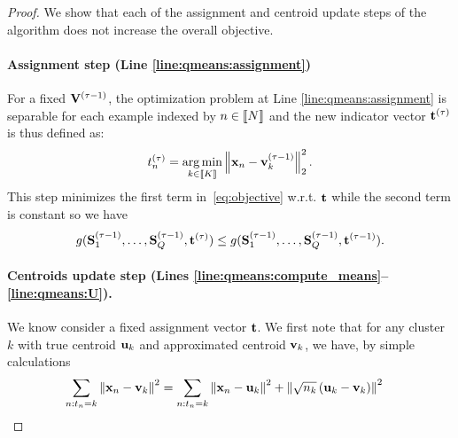\begin{proof}
We show that each of the assignment and centroid update steps of the algorithm does not increase the overall objective. 

\paragraph{Assignment step (Line \ref{line:qmeans:assignment})} For a fixed ${\mathbf{V}}^{(\tau-1)}$, the optimization problem at Line \ref{line:qmeans:assignment} is separable for each example indexed by $n \in \left \llbracket N\right \rrbracket$ and the new indicator vector ${\mathbf{t}}^{(\tau)}$ is thus defined as:
%
\begin{align}
\label{eq:qmean_problem_U_fixed}
 t^{(\tau)}_n = \operatorname*{arg\,min}_{k \in \left \llbracket K\right \rrbracket} \left \| {\mathbf{x}}_n - {\mathbf{v}}_k^{(\tau-1)}\right \|_2^2.
\end{align}
%
This step minimizes the first term in~\eqref{eq:objective} w.r.t. ${\mathbf{t}}$ while the second term is constant so we have 
\begin{align*}
g({\mathbf{S}}_1^{(\tau-1)}, \ldots,{\mathbf{S}}_Q^{(\tau-1)}, {\mathbf{t}}^{(\tau)}) \leq g({\mathbf{S}}_1^{(\tau-1)}, \ldots,{\mathbf{S}}_Q^{(\tau-1)}, {\mathbf{t}}^{(\tau-1)}).
\end{align*}

\paragraph{Centroids update step (Lines \ref{line:qmeans:compute_means}--\ref{line:qmeans:U}).} We know consider a fixed assignment vector ${\mathbf{t}}$. We first note that for any cluster $k$ with true centroid ${\mathbf{u}}_k$ and approximated centroid ${\mathbf{v}}_k$, we have, by simple calculations
\begin{align}
    \label{eq:rewrite_assignement}
	\sum_{n: t_n = k} \left \| {\mathbf{x}}_n -{\mathbf{v}}_k\right \|^2
	&= \sum_{n: t_n = k} \left \| {\mathbf{x}}_n-{\mathbf{u}}_k\right \|^2 + \left \| \sqrt{n_k}\left ({\mathbf{u}}_k-{\mathbf{v}}_k\right )\right \|^2
\end{align}


\end{proof}
